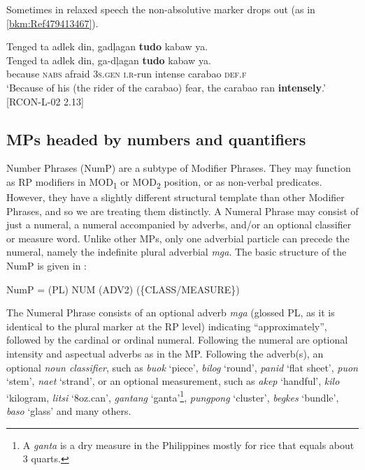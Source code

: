 Sometimes in relaxed speech the non-absolutive marker drops out (as in \ref{bkm:Ref479413467}).

\ea
\label{bkm:Ref479413467}
Tenged  ta  adlek  din,  gadļagan  \textbf{tudo}  kabaw  ya. \\\smallskip
 \gll Tenged  ta  adlek  din,  ga-dļagan  \textbf{tudo}  kabaw  ya. \\
because  \textsc{nabs}  afraid  3\textsc{s.gen}  \textsc{i.r}-run  intense  carabao  \textsc{def.f} \\
\glt ‘Because of his (the rider of the carabao) fear, the carabao ran \textbf{intensely}.’ [RCON-L-02 2.13]
\z

\largerpage[2]
\subsection{MPs headed by numbers and quantifiers}
\label{bkm:Ref439924202}

Number Phrases (NumP) are a subtype of Modifier Phrases. They may function as RP modifiers in MOD\textsubscript{1} or MOD\textsubscript{2} position, or as non-verbal predicates. However, they have a slightly different structural template than other Modifier Phrases, and so we are treating them distinctly. A Numeral Phrase may consist of just a numeral, a numeral accompanied by adverbs, and/or an optional classifier or measure word. Unlike other MPs, only one adverbial particle can precede the numeral, namely the indefinite plural adverbial \textit{mga}. The basic structure of the NumP is given in :

\ea
\label{bkm:Ref343924122}  NumP = (PL) NUM (ADV2) (\{CLASS/MEASURE\})
\z

The Numeral Phrase consists of an optional adverb \textit{mga} (glossed PL, as it is identical to the plural marker at the RP level) indicating “approximately”, followed by the cardinal or ordinal numeral. Following the numeral are optional intensity and aspectual adverbs as in the MP. Following the adverb(s), an optional \textit{noun classifier}, such as \textit{buok} ‘piece’, \textit{bilog} ‘round’, \textit{panid} ‘flat sheet’, \textit{puon} ‘stem’, \textit{naet} ‘strand’, or an optional measurement, such as \textit{akep} ‘handful’, \textit{kilo} ‘kilogram, \textit{litsi} ‘8oz.can’, \textit{gantang} ‘ganta’\footnote{A \textit{ganta} is a dry measure in the Philippines mostly for rice that equals about 3 quarts.}, \textit{pungpong} ‘cluster’, \textit{begkes} ‘bundle’, \textit{baso} ‘glass’ and many others.


